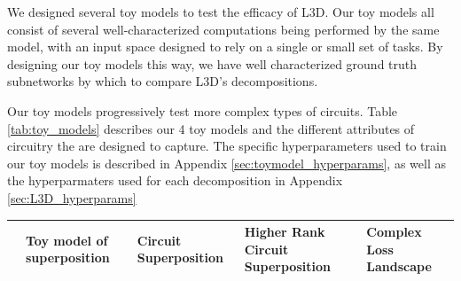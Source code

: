 \documentclass{article}
\theoremstyle{plain}
\theoremstyle{definition}
\theoremstyle{remark}
\begin{document}
We designed several toy models to test the efficacy of L3D. Our toy models all consist of several well-characterized computations being performed by the same model, with an input space designed to rely on a single or small set of tasks. By designing our toy models this way, we have well characterized ground truth subnetworks by which to compare L3D's decompositions.

Our toy models progressively test more complex types of circuits. Table \ref{tab:toy_models} describes our 4 toy models and the different attributes of circuitry the are designed to capture. The specific hyperparameters used to train our toy models is described in Appendix \ref{sec:toymodel_hyperparams}, as well as the hyperparmaters used for each decomposition in Appendix \ref{sec:L3D_hyperparams}

\begin{table}[htb]
    \centering
    \begin{tabularx}{\textwidth}{X X X X X}  %
        \toprule
         & Toy model of superposition & Circuit Superposition & Higher Rank Circuit Superposition & Complex Loss Landscape \\  
        \midrule


\end{tabularx}
\end{table}
\end{document}
